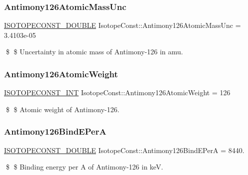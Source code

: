 \subsubsection{\texorpdfstring{Antimony126\+Atomic\+Mass\+Unc}{Antimony126AtomicMassUnc}}
{\footnotesize\ttfamily \mbox{\hyperlink{group___isotope_const-_macros_ga8f45a7272ce02c0b4c65c44636ed719a}{I\+S\+O\+T\+O\+P\+E\+C\+O\+N\+S\+T\+\_\+\+D\+O\+U\+B\+LE}} Isotope\+Const\+::\+Antimony126\+Atomic\+Mass\+Unc = 3.\+4103e-\/05}

\$ \$ Uncertainty in atomic mass of Antimony-\/126 in amu. \mbox{\label{group___isotope_const-_antimony-_sb126_ga68f0eb7bffb7a7c7540ca603835f7696}} 
\subsubsection{\texorpdfstring{Antimony126\+Atomic\+Weight}{Antimony126AtomicWeight}}
{\footnotesize\ttfamily \mbox{\hyperlink{group___isotope_const-_macros_ga5f18360b3e99483a35c32d789e62621c}{I\+S\+O\+T\+O\+P\+E\+C\+O\+N\+S\+T\+\_\+\+I\+NT}} Isotope\+Const\+::\+Antimony126\+Atomic\+Weight = 126}

\$ \$ Atomic weight of Antimony-\/126. \mbox{\label{group___isotope_const-_antimony-_sb126_ga79788885792e5a7095d8b5f3063ce148}} 
\subsubsection{\texorpdfstring{Antimony126\+Bind\+E\+PerA}{Antimony126BindEPerA}}
{\footnotesize\ttfamily \mbox{\hyperlink{group___isotope_const-_macros_ga8f45a7272ce02c0b4c65c44636ed719a}{I\+S\+O\+T\+O\+P\+E\+C\+O\+N\+S\+T\+\_\+\+D\+O\+U\+B\+LE}} Isotope\+Const\+::\+Antimony126\+Bind\+E\+PerA = 8440.}

\$ \$ Binding energy per A of Antimony-\/126 in keV. \mbox{\label{group___isotope_const-_antimony-_sb126_ga7c0811d44fe013b7c83d1bb749bf79a0}} 
